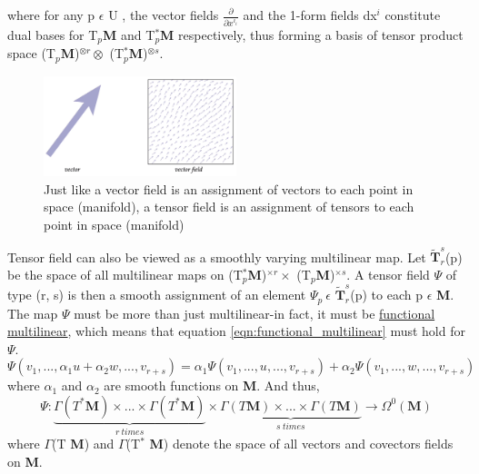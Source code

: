 where for any p $\epsilon$ U , the vector fields $\frac{\partial}{\partial x^{i_i}}$ and the 1-form fields dx$^i$ constitute dual bases for
T$_p$\textbf{M} and T$_p^*$\textbf{M} respectively, thus forming a basis of tensor product space (T$_p$\textbf{M})$^{\otimes r} \otimes$ (T$_p^*$\textbf{M})$^{\otimes s}$.

\begin{figure}[h]
    \begin{center}
        \includegraphics[width=0.5\textwidth]{figures/vector_field.png}
        \caption{Just like a vector field is an assignment of vectors to each point in space (manifold),
        a tensor field is an assignment of tensors to each point in space (manifold)}
    \end{center}
\end{figure} 

Tensor field can also be viewed as a smoothly varying multilinear map. 
Let $\widetilde{\textbf{T}}^s_r$(p) be the space of all multilinear maps on (T$_p^*$\textbf{M})$^{\times r} \times$ (T$_p$\textbf{M})$^{\times s}$.
A tensor field $\Psi$ of type (r, s) is then a smooth assignment of an element $\Psi_p \: \epsilon$
$\widetilde{\textbf{T}}^s_r$(p) to each p $\epsilon$ \textbf{M}. 
The map $\Psi$ must be more than just multilinear-in fact, it must be \href{https://math.stackexchange.com/questions/2138459/understanding-the-definition-of-tensors-as-multilinear-maps}{functional multilinear}, 
which means that equation \ref{eqn:functional_multilinear} must hold for $\Psi$.
\begin{equation}
    \Psi(v_1, ..., \alpha_1 u + \alpha_2 w, ..., v_{r+s}) = \alpha_1 \Psi(v_1, ..., u, ..., v_{r+s}) + \alpha_2 \Psi(v_1, ..., w, ..., v_{r+s})
    \label{eqn:functional_multilinear}
\end{equation}
where $\alpha_1$ and $\alpha_2$ are smooth functions on \textbf{M}. And thus,
\begin{equation}
    \Psi: \underbrace{\Gamma(T^*\textbf{M}) \times ... \times \Gamma(T^*\textbf{M})}_{r \:times} \times \underbrace{\Gamma(T \textbf{M}) \times ... \times \Gamma(T \textbf{M})}_{s\: times} \rightarrow \Omega^0 (\textbf{M})
    \label{eqn:0-form}
\end{equation}
where $\Gamma$(T \textbf{M}) and $\Gamma$(T$^*$ \textbf{M}) denote the space of all vectors and covectors fields on \textbf{M}.

